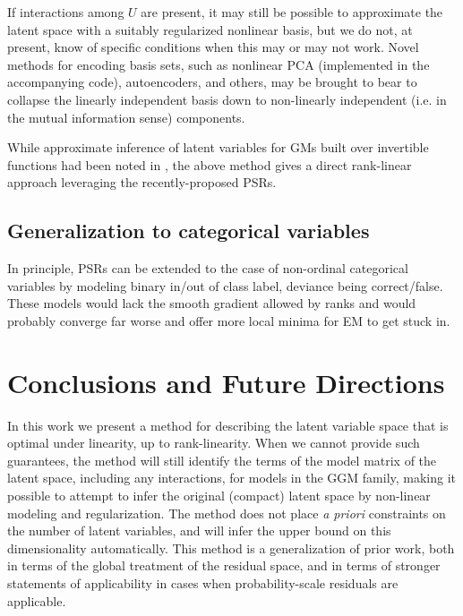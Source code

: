 \documentclass{article}
\begin{document}
If interactions among $U$ are present, it may still be possible to approximate the latent space with a suitably regularized nonlinear basis, but we do not, at present, know of specific conditions when this may or may not work.  Novel methods for encoding basis sets, such as nonlinear PCA (implemented in the accompanying code), autoencoders, and others, may be brought to bear to collapse the linearly independent basis down to non-linearly independent (i.e. in the mutual information sense) components.

While approximate inference of latent variables for GMs built over invertible functions had been noted in \cite{elidan_ideal_2007}, the above method gives a direct rank-linear approach leveraging the recently-proposed PSRs.

\subsection{Generalization to categorical variables}
In principle, PSRs can be extended to the case of non-ordinal categorical variables by modeling binary in/out of class label, deviance being correct/false.  These models would lack the smooth gradient allowed by ranks and would probably converge far worse and offer more local minima for EM to get stuck in.  

\section{Conclusions and Future Directions}
In this work we present a method for describing the latent variable space that is optimal under linearity, up to rank-linearity.  When we cannot provide such guarantees, the method will still identify the terms of the model matrix of the latent space, including any interactions, for models in the GGM family, making it possible to attempt to infer the original (compact) latent space by non-linear modeling and regularization.  The method does not place \textit{a priori} constraints on the number of latent variables, and will infer the upper bound on this dimensionality automatically.  This method is a generalization of prior work, both in terms of the global treatment of the residual space, and in terms of stronger statements of applicability in cases when probability-scale residuals are applicable.  
\end{document}
